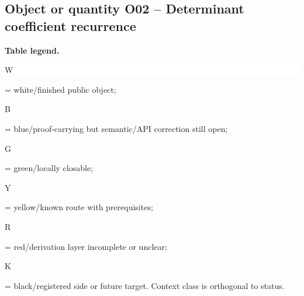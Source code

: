 \subsection*{Object or quantity O02 -- Determinant coefficient recurrence}
\hypertarget{objproof:O02}{}
\par\smallskip\noindent\begin{minipage}{0.99\linewidth}\footnotesize\raggedright\textbf{Table legend.} \colorbox{white}{\strut W} = white/finished public object; \colorbox{cyan!20}{\strut B} = blue/proof-carrying but semantic/API correction still open; \colorbox{green!18}{\strut G} = green/locally closable; \colorbox{yellow!25}{\strut Y} = yellow/known route with prerequisites; \colorbox{red!20}{\strut R} = red/derivation layer incomplete or unclear; \colorbox{black!18}{\strut K} = black/registered side or future target. Context class is orthogonal to status.\end{minipage}\par\vspace{0.25em}
